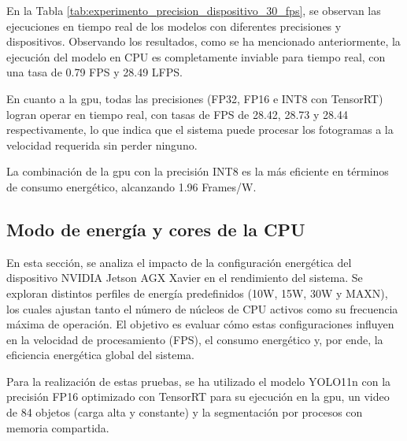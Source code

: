 \documentclass[11pt,spanish,listoffigures,listoftables]{tfgetsinf}
\begin{document}
   En la Tabla \ref{tab:experimento_precision_dispositivo_30_fps}, se observan las ejecuciones en tiempo real de los modelos con diferentes precisiones y dispositivos. Observando los resultados, como se ha mencionado anteriormente, la ejecución del modelo en CPU es completamente inviable para tiempo real, con una tasa de 0.79 FPS y 28.49 LFPS.

   En cuanto a la \gls{gpu}, todas las precisiones (FP32, FP16 e INT8 con TensorRT) logran operar en tiempo real, con tasas de FPS de 28.42, 28.73 y 28.44 respectivamente, lo que indica que el sistema puede procesar los fotogramas a la velocidad requerida sin perder ninguno.

   La combinación de la \gls{gpu} con la precisión INT8 es la más eficiente en términos de consumo energético, alcanzando 1.96 Frames/W.

   \subsection{Modo de energía y cores de la CPU} \label{sub:modo_energia}
   En esta sección, se analiza el impacto de la configuración energética del dispositivo NVIDIA Jetson AGX Xavier en el rendimiento del sistema. Se exploran distintos perfiles de energía predefinidos (10W, 15W, 30W y MAXN), los cuales ajustan tanto el número de núcleos de CPU activos como su frecuencia máxima de operación. El objetivo es evaluar cómo estas configuraciones influyen en la velocidad de procesamiento (FPS), el consumo energético y, por ende, la eficiencia energética global del sistema.

   Para la realización de estas pruebas, se ha utilizado el modelo YOLO11n con la precisión FP16 optimizado con TensorRT para su ejecución en la \gls{gpu}, un video de 84 objetos (carga alta y constante) y la segmentación por procesos con memoria compartida.
\end{document}

